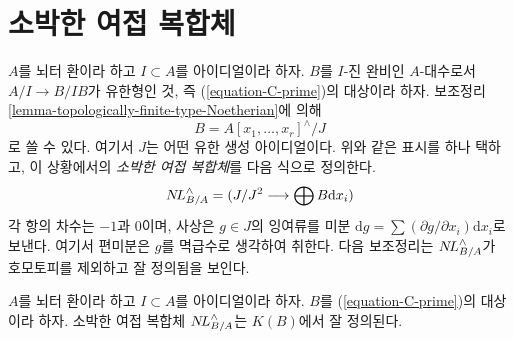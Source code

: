 \section{소박한 여접 복합체}
\label{section-naive-cotangent-complex}

\noindent
$A$를 뇌터 환이라 하고 $I \subset A$를 아이디얼이라 하자.
$B$를 $I$-진 완비인 $A$-대수로서 $A/I \to B/IB$가 유한형인 것,
즉 (\ref{equation-C-prime})의 대상이라 하자.
보조정리 \ref{lemma-topologically-finite-type-Noetherian}에 의해
$$
B = A[x_1, \ldots, x_r]^\wedge / J
$$
로 쓸 수 있다. 여기서 $J$는 어떤 유한 생성 아이디얼이다.
위와 같은 표시를 하나 택하고, 이 상황에서의 {\it 소박한 여접 복합체}를
다음 식으로 정의한다.
\begin{equation}
\label{equation-NL}
\mathop{N\!L}\nolimits_{B/A}^\wedge = (J/J^2 \longrightarrow \bigoplus B\text{d}x_i)
\end{equation}
각 항의 차수는 $-1$과 $0$이며, 사상은 $g \in J$의 잉여류를 미분
$\text{d}g = \sum (\partial g/\partial x_i) \text{d}x_i$로 보낸다.
여기서 편미분은 $g$를 멱급수로 생각하여 취한다.
다음 보조정리는 $\mathop{N\!L}\nolimits_{B/A}^\wedge$가 호모토피를 제외하고 잘 정의됨을 보인다.

\begin{lemma}
\label{lemma-NL-up-to-homotopy}
$A$를 뇌터 환이라 하고 $I \subset A$를 아이디얼이라 하자.
$B$를 (\ref{equation-C-prime})의 대상이라 하자.
소박한 여접 복합체 $\mathop{N\!L}\nolimits_{B/A}^\wedge$는 $K(B)$에서 잘 정의된다.
\end{lemma}

